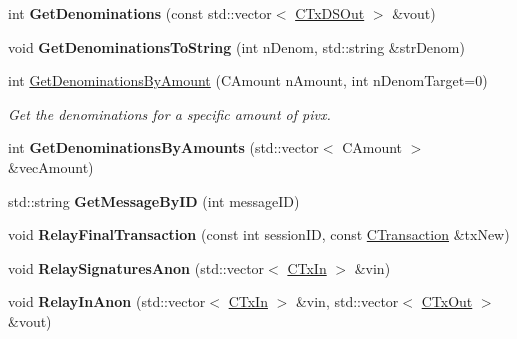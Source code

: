 \begin{DoxyCompactItemize}
int {\bfseries Get\+Denominations} (const std\+::vector$<$ \mbox{\hyperlink{class_c_tx_d_s_out}{C\+Tx\+D\+S\+Out}} $>$ \&vout)
\item 
\mbox{\label{class_c_obfuscation_pool_a09e08db03e7171cbf7d6058243540760}} 
void {\bfseries Get\+Denominations\+To\+String} (int n\+Denom, std\+::string \&str\+Denom)
\item 
\mbox{\label{class_c_obfuscation_pool_a1497a31a5b0ed7378282e23db3481da9}} 
int \mbox{\hyperlink{class_c_obfuscation_pool_a1497a31a5b0ed7378282e23db3481da9}{Get\+Denominations\+By\+Amount}} (C\+Amount n\+Amount, int n\+Denom\+Target=0)
\begin{DoxyCompactList}\small\item\em Get the denominations for a specific amount of pivx. \end{DoxyCompactList}\item 
\mbox{\label{class_c_obfuscation_pool_a25107ff0bd9a447723d165aa5b53a036}} 
int {\bfseries Get\+Denominations\+By\+Amounts} (std\+::vector$<$ C\+Amount $>$ \&vec\+Amount)
\item 
\mbox{\label{class_c_obfuscation_pool_a4f9ec32ab5edd5e3718cd30e71712668}} 
std\+::string {\bfseries Get\+Message\+By\+ID} (int message\+ID)
\item 
\mbox{\label{class_c_obfuscation_pool_ad4e4c2c2ee843c824b3534a47e26cead}} 
void {\bfseries Relay\+Final\+Transaction} (const int session\+ID, const \mbox{\hyperlink{class_c_transaction}{C\+Transaction}} \&tx\+New)
\item 
\mbox{\label{class_c_obfuscation_pool_a3da993b552c5bcdeebde27fa12ad9f4c}} 
void {\bfseries Relay\+Signatures\+Anon} (std\+::vector$<$ \mbox{\hyperlink{class_c_tx_in}{C\+Tx\+In}} $>$ \&vin)
\item 
\mbox{\label{class_c_obfuscation_pool_a126aeec2c18f115b69479878833175e9}} 
void {\bfseries Relay\+In\+Anon} (std\+::vector$<$ \mbox{\hyperlink{class_c_tx_in}{C\+Tx\+In}} $>$ \&vin, std\+::vector$<$ \mbox{\hyperlink{class_c_tx_out}{C\+Tx\+Out}} $>$ \&vout)
\item 

\end{DoxyCompactItemize}
